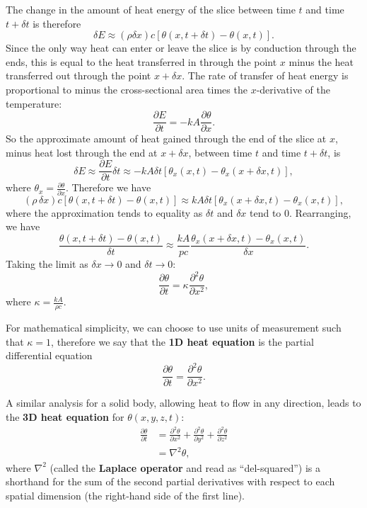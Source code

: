 \documentclass{article}
\begin{document}
The change in the amount of heat energy of the slice between time $t$ and time $t+\delta t$ is therefore
\[\delta E\approx (\rho \delta x)c\left[\theta(x,t+\delta t)-\theta(x,t)\right].\]
Since the only way heat can enter or leave the slice is by conduction through the ends, this is equal to the heat transferred in through the point $x$ minus the heat transferred out through the point $x+\delta x$. The rate of transfer of heat energy is proportional to minus the cross-sectional area times the $x$-derivative of the temperature:
\[\frac{\partial E}{\partial t}=-kA\frac{\partial \theta}{\partial x}.\]
So the approximate amount of heat gained through the end of the slice at $x$, minus heat lost through the end at $x+\delta x$, between time $t$ and time $t+\delta t$, is
\[\delta E\approx \frac{\partial E}{\partial t}\delta t \approx -kA \delta t\left[\theta_x(x,t) - \theta_x(x+\delta x,t)\right],\]
where $\theta_x=\frac{\partial \theta}{\partial x}$.
Therefore we have
\[(\rho\,\delta x)c\left[\theta(x,t+\delta t)-\theta(x,t)\right] \approx kA \delta t\left[\theta_x(x+\delta x,t) - \theta_x(x,t)\right],\]
where the approximation tends to equality as $\delta t$ and $\delta x$ tend to 0. Rearranging, we have
\[\frac{\theta(x,t+\delta t)-\theta(x,t)}{\delta t}\approx \frac{kA}{pc}\frac{\theta_x(x+\delta x,t)-\theta_x(x,t)}{\delta x}.\]
Taking the limit as $\delta x\to 0$ and $\delta t\to 0$:
\[\frac{\partial \theta}{\partial t}=\kappa \frac{\partial^2\theta}{\partial x^2},\]
where $\kappa=\frac{kA}{\rho c}$.

For mathematical simplicity, we can choose to use units of measurement such that $\kappa=1$, therefore we say that the \textbf{1D heat equation} is the partial differential equation
\[\frac{\partial \theta}{\partial t}=\frac{\partial^2 \theta}{\partial x^2}.\]\medskip


A similar analysis for a solid body, allowing heat to flow in any direction, leads to the \textbf{3D heat equation} for $\theta(x,y,z,t)$:
\begin{align*}
	\frac{\partial\theta}{\partial t}&=\frac{\partial^2\theta}{\partial x^2}+\frac{\partial^2\theta}{\partial y^2}+\frac{\partial^2\theta}{\partial z^2}\\
	&=\nabla^2\theta,
\end{align*}
where $\nabla^2$ (called the \textbf{Laplace operator} and read as ``del-squared'') is a shorthand for the sum of the second partial derivatives with respect to each spatial dimension (the right-hand side of the first line).
\end{document}
